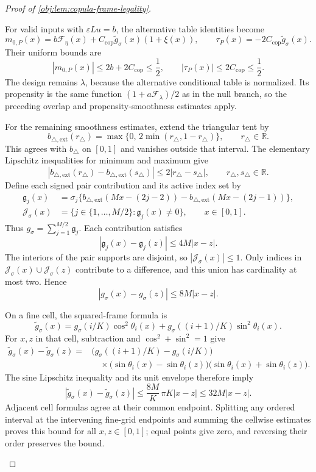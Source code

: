 \begin{proof}[Proof of \cref{obj:lem:copula-frame-legality}]
\begin{enumerate}
For valid inputs with \(\varepsilon Lu=b\), the alternative table identities become
\[
m_{0,P}(x)
=b\mathcal F_\eta(x)
 +C_{\mathrm{cop}}\widetilde g_\sigma(x)(1+\xi(x)),
\qquad
\tau_P(x)=-2C_{\mathrm{cop}}\widetilde g_\sigma(x).
\]
Their uniform bounds are
\[
|m_{0,P}(x)|
\le2b+2C_{\mathrm{cop}}\le\frac12,
\qquad
|\tau_P(x)|\le2C_{\mathrm{cop}}\le\frac12.
\]
The design remains \(\lambda\), because the alternative conditional table is normalized. Its propensity is the same function
\((1+a\mathcal F_\lambda)/2\) as in the null branch, so the preceding overlap and propensity-smoothness estimates apply.

For the remaining smoothness estimates, extend the triangular tent by
\[
b_{\triangle,\mathrm{ext}}(r_\triangle)
=\max\{0,\,2\min(r_\triangle,1-r_\triangle)\},
\qquad r_\triangle\in\mathbb R.
\]
This agrees with \(b_\triangle\) on \([0,1]\) and vanishes outside that interval. The elementary Lipschitz inequalities for minimum and maximum give
\[
|b_{\triangle,\mathrm{ext}}(r_\triangle)
 -b_{\triangle,\mathrm{ext}}(s_\triangle)|
\le2|r_\triangle-s_\triangle|,
\qquad r_\triangle,s_\triangle\in\mathbb R.
\]
Define each signed pair contribution and its active index set by
\[
\begin{aligned}
\mathfrak g_j(x)
&=\sigma_j\bigl\{
b_{\triangle,\mathrm{ext}}(Mx-(2j-2))
-b_{\triangle,\mathrm{ext}}(Mx-(2j-1))
\bigr\},\\
\mathcal J_\sigma(x)
&=\{j\in\{1,\ldots,M/2\}:\mathfrak g_j(x)\ne0\},
\qquad x\in[0,1].
\end{aligned}
\]
Thus \(g_\sigma=\sum_{j=1}^{M/2}\mathfrak g_j\).
Each contribution satisfies
\[
|\mathfrak g_j(x)-\mathfrak g_j(z)|
\le4M|x-z|.
\]
The interiors of the pair supports are disjoint, so
\(|\mathcal J_\sigma(x)|\le1\). Only indices in
\(\mathcal J_\sigma(x)\cup\mathcal J_\sigma(z)\) contribute to a difference, and this union has cardinality at most two. Hence
\[
|g_\sigma(x)-g_\sigma(z)|\le8M|x-z|.
\]

On a fine cell, the squared-frame formula is
\[
\widetilde g_\sigma(x)
=g_\sigma(i/K)\cos^2\theta_i(x)
 +g_\sigma((i+1)/K)\sin^2\theta_i(x).
\]
For \(x,z\) in that cell, subtraction and
\(\cos^2+\sin^2=1\) give
\[
\begin{aligned}
\widetilde g_\sigma(x)-\widetilde g_\sigma(z)
={}&\bigl(g_\sigma((i+1)/K)-g_\sigma(i/K)\bigr)\\
&\quad{}\times
\bigl(\sin\theta_i(x)-\sin\theta_i(z)\bigr)
\bigl(\sin\theta_i(x)+\sin\theta_i(z)\bigr).
\end{aligned}
\]
The sine Lipschitz inequality and its unit envelope therefore imply
\[
|\widetilde g_\sigma(x)-\widetilde g_\sigma(z)|
\le\frac{8M}{K}\,\pi K|x-z|
\le32M|x-z|.
\]
Adjacent cell formulas agree at their common endpoint. Splitting any ordered interval at the intervening fine-grid endpoints and summing the cellwise estimates proves this bound for all \(x,z\in[0,1]\); equal points give zero, and reversing their order preserves the bound.


\end{enumerate}
\end{proof}
